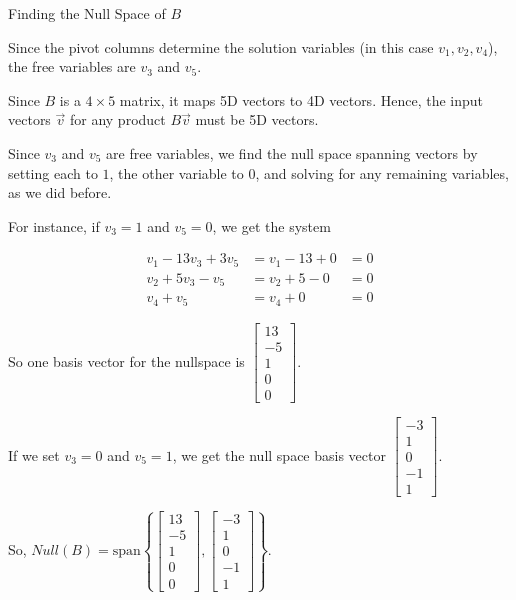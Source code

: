 \documentclass{ximera}
\begin{document}
\begin{problem}{Finding the Null Space of $B$}
\begin{solution}
    Since the pivot columns determine the solution variables (in this case $v_1, v_2, v_4$), the free variables are $v_3$ and $v_5$. 

    Since $B$ is a $4\times 5$ matrix, it maps 5D vectors to 4D vectors. Hence, the input vectors $\vec{v}$ for any product $B\vec{v}$ must be 5D vectors.

    Since $v_3$ and $v_5$ are free variables, we find the null space spanning vectors by setting each to $1$, the other variable to $0$, and solving for any remaining variables, as we did before.

    For instance, if $v_3=1$ and $v_5=0$, we get the system

    \[
    \begin{aligned}
        v_1 - 13v_3 + 3v_5 &= v_1 - 13 + 0 &= 0 \\
        v_2 + 5v_3 - v_5 &= v_2 + 5 - 0 &= 0 \\
        v_4 + v_5 &= v_4 + 0 &= 0
    \end{aligned}
    \]



    So one basis vector for the nullspace is $\begin{bmatrix} 13 \\ -5 \\ 1 \\ 0 \\ 0 \end{bmatrix}$.

    If we set $v_3=0$ and $v_5=1$, we get the null space basis vector $\begin{bmatrix} -3 \\ 1 \\ 0 \\ -1 \\ 1 \end{bmatrix}$.

    So, $Null(B)=\text{span}\left\{ \begin{bmatrix} 13 \\ -5 \\ 1 \\ 0 \\ 0 \end{bmatrix}, \begin{bmatrix} -3 \\ 1 \\ 0 \\ -1 \\ 1 \end{bmatrix} \right\}$.

    \end{solution}

\end{problem}
\end{document}
